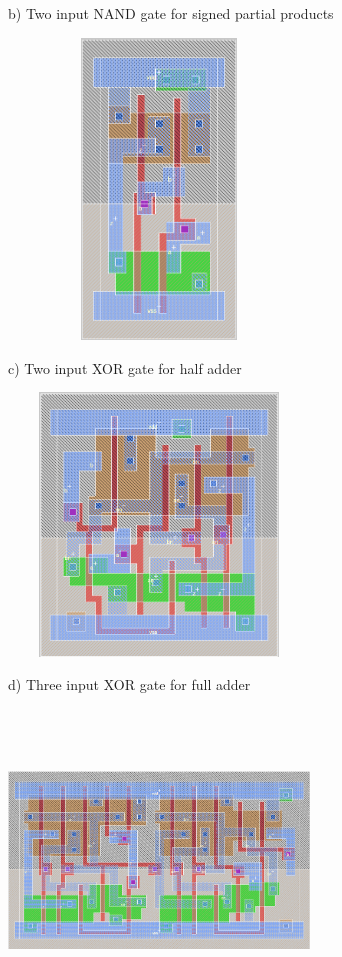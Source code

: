 \documentclass[12pt]{report}
\begin{document}
b) Two input NAND gate for signed partial products
\begin{center}
\includegraphics[height=8cm, width=8cm]{NANDcell}
\end{center}
\newpage
\begin{flushleft}
c) Two input XOR gate for half adder
\end{flushleft}
\begin{center}
\includegraphics[height=7cm, width=8cm]{XOR2cell}
\end{center}
d) Three input XOR gate for full adder
\begin{center}
\includegraphics[height=8cm, width=8cm]{XOR3cell}
\end{center}
\end{document}
